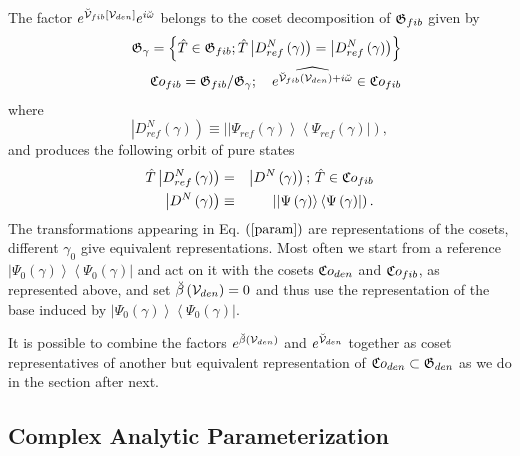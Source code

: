 The factor $e^{{\cal \breve{V}}_{fib}\left[ {\cal V}_{den}\right] }e^{i%
\breve{\omega}}$ belongs to the coset decomposition of ${\frak G}_{fib}$
given by 
\begin{eqnarray}
&&{\frak G}_{\gamma }=\left\{ \hat{T}\in {\frak G}_{fib}{\frak ;\,}\hat{T}%
\left| D_{ref}^{N}\left( \gamma \right) \right) =\left| D_{ref}^{N}\left(
\gamma \right) \right) \right\}  \nonumber \\
&&{\frak Co}_{fib}={\frak G}_{fib}/{\frak G}_{\gamma };\quad \widehat{e^{%
{\cal \breve{V}}_{fib}({\cal V}_{den})+i\breve{\omega}}}\in {\frak Co}_{fib}
\end{eqnarray}%
where 
\begin{equation}
\left| D_{ref}^{N}\left( \gamma \right) \right) \equiv \left| \left| \Psi
_{ref}\left( \gamma \right) \right\rangle \left\langle \Psi _{ref}\left(
\gamma \right) \right| \right) ,
\end{equation}%
and produces the following orbit of pure states%
\begin{eqnarray}
\hat{T}\left| D_{ref}^{N}\left( \gamma \right) \right) &=&\left| D^{N}\left(
\gamma \right) \right) ;\,\hat{T}\in {\frak Co}_{fib}  \nonumber \\
\left| D^{N}\left( \gamma \right) \right) &\equiv &\left| \left| \Psi \left(
\gamma \right) \right\rangle \left\langle \Psi \left( \gamma \right) \right|
\right) .
\end{eqnarray}%
The transformations appearing in Eq. $\left( \ref{param}\right) $ are
representations of the cosets, different $\gamma _{0}$ give equivalent
representations. Most often we start from a reference $\left| \Psi
_{0}\left( \gamma \right) \right\rangle \left\langle \Psi _{0}\left( \gamma
\right) \right| $ and act on it with the cosets ${\frak Co}_{den}$ and $%
{\frak Co}_{fib}$, as represented above, and set ${\cal \breve{\beta}}\left( 
{\cal V}_{den}\right) =0$ and thus use the representation of the base
induced by $\left| \Psi _{0}\left( \gamma \right) \right\rangle \left\langle
\Psi _{0}\left( \gamma \right) \right| $.

It is possible to combine the factors $e^{{\cal \breve{\beta}}\left( {\cal V}%
_{den}\right) }$ and $e^{{\cal \breve{V}}_{den}}$ together as coset
representatives of another but equivalent representation of ${\frak Co}%
_{den}\subset {\frak G}_{den}$ as we do in the section after next.

\subsection{Complex Analytic Parameterization}


